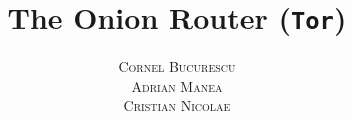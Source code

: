 \documentclass[12pt, a4paper]{book}
\begin{document}
\thispagestyle{empty}
\pagestyle{plain} %

\title{\Huge The Onion Router (\texttt{Tor})}
\vspace{1cm}
\author{\large\textsc{Cornel Bucurescu} \\
  \large\textsc{Adrian Manea} \\
\large\textsc{Cristian Nicolae}}

\maketitle

\tableofcontents

\setcounter{page}{1} %








\renewcommand{\indexname}{Index}
\printindex



\nocite{*}
\end{document}
